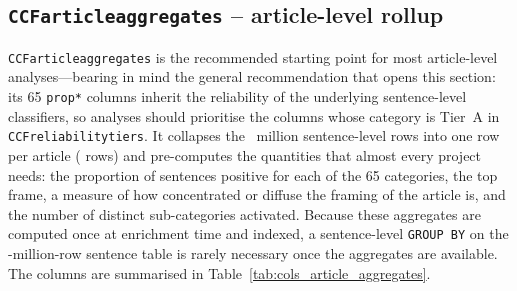 \documentclass[12pt]{article}
\renewcommand\_{\texttt{\detokenize{_}\allowbreak}}
\begin{document}
\subsection{\texttt{CCF\_article\_aggregates} -- article-level rollup}
\label{subsec:data_aggregates}

\texttt{CCF\_article\_aggregates} is the recommended starting point for most article-level analyses---bearing in mind the general recommendation that opens this section: its 65 \texttt{prop\_*} columns inherit the reliability of the underlying sentence-level classifiers, so analyses should prioritise the columns whose category is Tier~A in \texttt{CCF\_reliability\_tiers}. It collapses the \CCFsentApprox{}~million sentence-level rows into one row per article (\CCFarticles{} rows) and pre-computes the quantities that almost every project needs: the proportion of sentences positive for each of the 65 categories, the top frame, a measure of how concentrated or diffuse the framing of the article is, and the number of distinct sub-categories activated. Because these aggregates are computed once at enrichment time and indexed, a sentence-level \texttt{GROUP BY} on the \CCFsentApprox{}-million-row sentence table is rarely necessary once the aggregates are available. The columns are summarised in Table~\ref{tab:cols_article_aggregates}.
\end{document}
